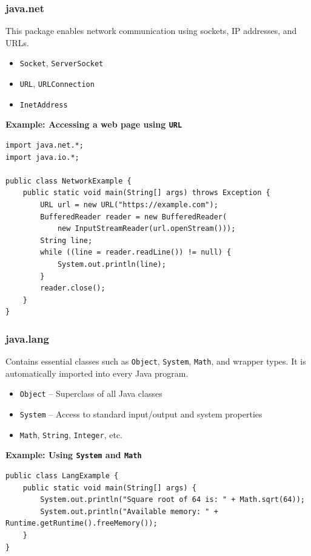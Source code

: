 \documentclass{article}
\newcommand{\codecmd}[1]{\textcolor[rgb]{0,0.5,0}{\texttt{#1}}}
\begin{document}
\subsubsection*{java.net}

This package enables network communication using sockets, IP addresses, and URLs.

\begin{itemize}
    \item \codecmd{Socket}, \codecmd{ServerSocket}
    \item \codecmd{URL}, \codecmd{URLConnection}
    \item \codecmd{InetAddress}
\end{itemize}

\noindent\textbf{Example: Accessing a web page using \texttt{URL}}
\begin{verbatim}
import java.net.*;
import java.io.*;

public class NetworkExample {
    public static void main(String[] args) throws Exception {
        URL url = new URL("https://example.com");
        BufferedReader reader = new BufferedReader(
            new InputStreamReader(url.openStream()));
        String line;
        while ((line = reader.readLine()) != null) {
            System.out.println(line);
        }
        reader.close();
    }
}
\end{verbatim}

\subsubsection*{java.lang}

Contains essential classes such as \codecmd{Object}, \codecmd{System}, \codecmd{Math}, and wrapper types. It is automatically imported into every Java program.

\begin{itemize}
    \item \codecmd{Object} – Superclass of all Java classes
    \item \codecmd{System} – Access to standard input/output and system properties
    \item \codecmd{Math}, \codecmd{String}, \codecmd{Integer}, etc.
\end{itemize}

\noindent\textbf{Example: Using \texttt{System} and \texttt{Math}}
\begin{verbatim}
public class LangExample {
    public static void main(String[] args) {
        System.out.println("Square root of 64 is: " + Math.sqrt(64));
        System.out.println("Available memory: " + Runtime.getRuntime().freeMemory());
    }
}
\end{verbatim}
\end{document}
